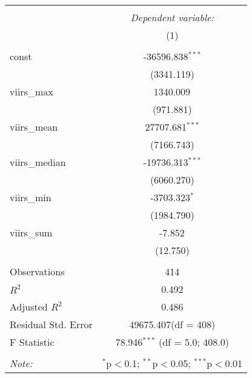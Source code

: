 \begin{table}[!htbp] \centering
\begin{tabular}{@{\extracolsep{5pt}}lc}
\\[-1.8ex]\hline
\hline \\[-1.8ex]
& \multicolumn{1}{c}{\textit{Dependent variable:}} \
\cr \cline{1-2}
\\[-1.8ex] & (1) \\
\hline \\[-1.8ex]
 const & -36596.838$^{***}$ \\
  & (3341.119) \\
 viirs_max & 1340.009$^{}$ \\
  & (971.881) \\
 viirs_mean & 27707.681$^{***}$ \\
  & (7166.743) \\
 viirs_median & -19736.313$^{***}$ \\
  & (6060.270) \\
 viirs_min & -3703.323$^{*}$ \\
  & (1984.790) \\
 viirs_sum & -7.852$^{}$ \\
  & (12.750) \\
\hline \\[-1.8ex]
 Observations & 414 \\
 $R^2$ & 0.492 \\
 Adjusted $R^2$ & 0.486 \\
 Residual Std. Error & 49675.407(df = 408)  \\
 F Statistic & 78.946$^{***}$ (df = 5.0; 408.0) \\
\hline
\hline \\[-1.8ex]
\textit{Note:} & \multicolumn{1}{r}{$^{*}$p$<$0.1; $^{**}$p$<$0.05; $^{***}$p$<$0.01} \\
\end{tabular}
\end{table}